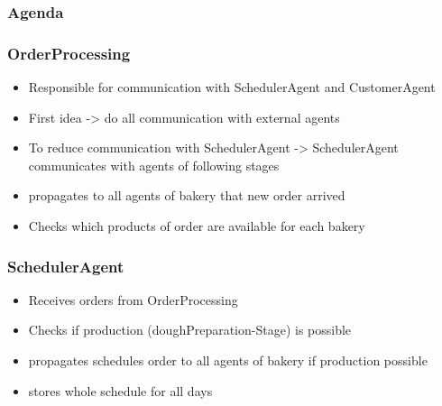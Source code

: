 \documentclass[hyperref={pdfpagelabels=false}]{beamer}
\author{Team PJT}
\title{\tit}
\begin{document}

    \begin{frame}
        \titlepage
    \end{frame}

    \begin{frame}
        \frametitle{Agenda}
        \hypertarget{tableofcontent}{}
        \tableofcontents
    \end{frame}

    \begin{frame}
        \frametitle{OrderProcessing}
        \begin{itemize}
            \item Responsible for communication with SchedulerAgent and CustomerAgent
            \item First idea -> do all communication with external agents
            \item To reduce communication with SchedulerAgent -> SchedulerAgent communicates with agents of following stages
            \item propagates to all agents of bakery that new order arrived
            \item Checks which products of order are available for each bakery
        \end{itemize}
    \end{frame}

    \begin{frame}
        \frametitle{SchedulerAgent}
        \begin{itemize}
            \item Receives orders from OrderProcessing
            \item Checks if production (doughPreparation-Stage) is possible
            \item propagates schedules order to all agents of bakery if production possible
            \item stores whole schedule for all days
        \end{itemize}
    \end{frame}
\end{document}
